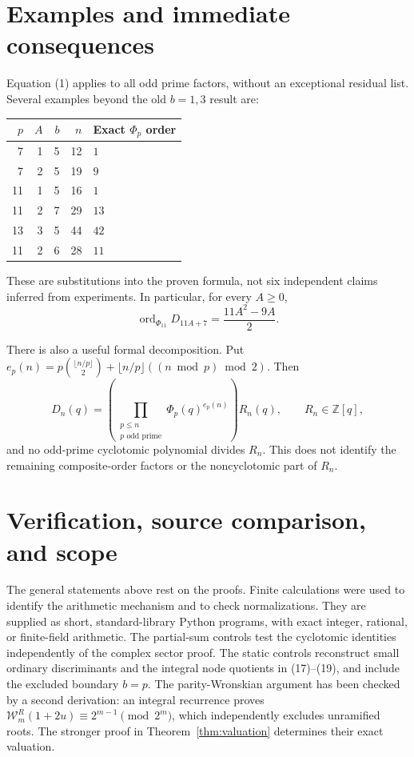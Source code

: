 \documentclass[11pt]{article}
\theoremstyle{remark}\newtheorem{remark}[theorem]{Remark}
\newcommand{\ord}{\operatorname{ord}}
\newcommand{\Z}{\mathbb{Z}}
\begin{document}
\section{Examples and immediate consequences}

Equation (1) applies to all odd prime factors, without an exceptional
residual list. Several examples beyond the old $b=1,3$ result are:
\begin{center}
\begin{tabular}{rrrrl}
\toprule
$p$ & $A$ & $b$ & $n$ & Exact $\Phi_p$ order\\
\midrule
7 & 1 & 5 & 12 & $1$\\
7 & 2 & 5 & 19 & $9$\\
11 & 1 & 5 & 16 & $1$\\
11 & 2 & 7 & 29 & $13$\\
13 & 3 & 5 & 44 & $42$\\
11 & 2 & 6 & 28 & $11$\\
\bottomrule
\end{tabular}
\end{center}
These are substitutions into the proven formula, not six independent
claims inferred from experiments. In particular, for every $A\geq0$,
\[
\ord_{\Phi_{11}}D_{11A+7}
=\frac{11A^2-9A}{2}.
\]

There is also a useful formal decomposition. Put
$e_p(n)=p\binom{\lfloor n/p\rfloor}{2}
+\lfloor n/p\rfloor((n\bmod p)\bmod2)$. Then
\[
D_n(q)=
\left(\prod_{\substack{p\leq n\\p\text{ odd prime}}}
\Phi_p(q)^{e_p(n)}\right)R_n(q),\qquad R_n\in\Z[q],
\]
and no odd-prime cyclotomic polynomial divides $R_n$.
This does not identify the remaining composite-order factors or the
noncyclotomic part of $R_n$.

\section{Verification, source comparison, and scope}

The general statements above rest on the proofs. Finite calculations
were used to identify the arithmetic mechanism and to check
normalizations. They are supplied as short, standard-library Python
programs, with exact integer, rational, or finite-field arithmetic.
The partial-sum controls test the cyclotomic identities independently
of the complex sector proof. The static controls reconstruct small
ordinary discriminants and the integral node quotients in
(17)--(19), and include the excluded boundary $b=p$.
The parity-Wronskian argument has been checked by a second derivation:
an integral recurrence proves
$\mathcal W_m^R(1+2u)\equiv2^{m-1}\pmod{2^m}$, which independently
excludes unramified roots. The stronger proof in
Theorem~\ref{thm:valuation} determines their exact valuation.
\end{document}
